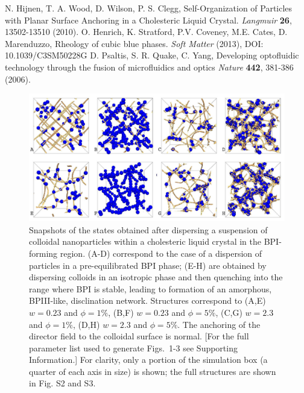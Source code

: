 \documentclass[12pt]{article}
\begin{document}
\begin{thebibliography}{99}
 N. Hijnen, T. A. Wood, D. Wilson, P. S. Clegg, 
Self-Organization of Particles with Planar Surface Anchoring in a Cholesteric
 Liquid Crystal. {\it Langmuir} {\bf 26}, 13502-13510 (2010).
 O. Henrich, K. Stratford, P.V. Coveney, M.E. Cates, D. Marenduzzo,
Rheology of cubic blue phases. {\it Soft Matter} (2013), DOI: 10.1039/C3SM50228G 
 D. Psaltis, S. R. Quake, C. Yang, Developing optofluidic technology through the fusion of microfluidics and optics {\it Nature} {\bf 442}, 381-386 (2006).

\end{thebibliography}

\newpage

\begin{figure}

\centerline{\includegraphics[width=\textwidth]{text-fig1.jpg}}
\caption{Snapshots of the states obtained after dispersing
a suspension of colloidal nanoparticles within a cholesteric liquid
crystal in the BPI-forming region. (A-D) correspond to the case
of a dispersion of particles in a pre-equilibrated BPI phase;
(E-H) are obtained by dispersing colloids in an isotropic
phase and then quenching into the range where BPI is stable, leading to formation of an amorphous, BPIII-like, disclination network.
Structures correspond
to (A,E) $w=0.23$ and $\phi=1\%$, 
(B,F) $w=0.23$ and $\phi=5\%$, 
(C,G) $w=2.3$ and $\phi=1\%$,
(D,H) $w=2.3$ and $\phi=5\%$.
The anchoring of the director field to the colloidal surface is normal.
[For the full parameter list used to generate Figs.~1-3 see Supporting Information.] For clarity, only a portion of the simulation box (a quarter of
each axis in size) is shown; the full structures are shown in Fig. S2 and S3.}
\end{figure}
\end{document}
